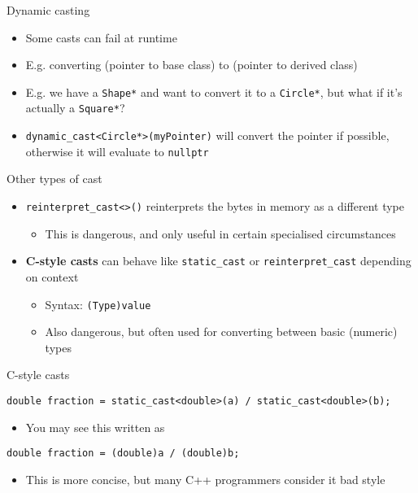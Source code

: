 \begin{frame}[fragile]{Dynamic casting}
    \begin{itemize}
        \item Some casts can fail at runtime \pause
        \item E.g. converting (pointer to base class) to (pointer to derived class) \pause
        \item E.g. we have a \lstinline{Shape*} and want to convert it to a \lstinline{Circle*},
            but what if it's actually a \lstinline{Square*}? \pause
        \item \lstinline{dynamic_cast<Circle*>(myPointer)} will convert the pointer if possible,
            otherwise it will evaluate to \lstinline{nullptr}
    \end{itemize}
\end{frame}

\begin{frame}[fragile]{Other types of cast}
    \begin{itemize}
        \item \lstinline{reinterpret_cast<>()} reinterprets the bytes in memory as a different type
        \begin{itemize}
            \item This is dangerous, and only useful in certain specialised circumstances
        \end{itemize}
        \pause
        \item \textbf{C-style casts} can behave like \lstinline{static_cast} or \lstinline{reinterpret_cast} depending on context
        \begin{itemize}
            \item Syntax: \lstinline{(Type)value} \pause
            \item Also dangerous, but often used for converting between basic (numeric) types
        \end{itemize}
    \end{itemize}
\end{frame}

\begin{frame}[fragile]{C-style casts}
    \begin{lstlisting}
double fraction = static_cast<double>(a) / static_cast<double>(b);
    \end{lstlisting}
    \pause
    \begin{itemize}
        \item You may see this written as
    \end{itemize}
    \begin{lstlisting}
double fraction = (double)a / (double)b;
    \end{lstlisting}
    \pause
    \begin{itemize}
        \item This is more concise, but many C++ programmers consider it bad style
    \end{itemize}
\end{frame}

